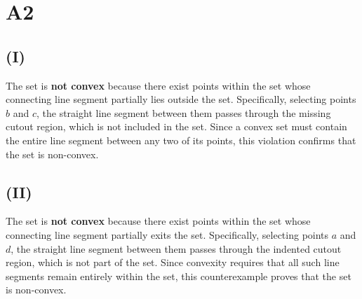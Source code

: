 \documentclass{article}
\begin{document}
\section*{A2}

\subsection*{(I)}

The set is \textbf{not convex} because there exist points within the set whose connecting line segment partially lies outside the set. Specifically, selecting points \( b \) and \( c \), the straight line segment between them passes through the missing cutout region, which is not included in the set. Since a convex set must contain the entire line segment between any two of its points, this violation confirms that the set is non-convex.

\subsection*{(II)}

The set is \textbf{not convex} because there exist points within the set whose connecting line segment partially exits the set. Specifically, selecting points \( a \) and \( d \), the straight line segment between them passes through the indented cutout region, which is not part of the set. Since convexity requires that all such line segments remain entirely within the set, this counterexample proves that the set is non-convex.
\end{document}
